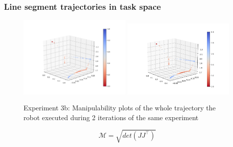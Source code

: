 \begin{frame}
\frametitle{Line segment trajectories in task space}
\begin{center}
\begin{figure}[!htb]
\centering
\includegraphics[width=0.49\textwidth]{../images/robot_planner3/robot_planner3b_manip1.png}
\includegraphics[width=0.49\textwidth]{../images/robot_planner3/robot_planner3b_manip2.png}
\caption{Experiment 3b: Manipulability plots of the whole trajectory the robot executed during 2 iterations of the same experiment}
\label{robot-planner3b-line-seg-manipulability-plots}
\end{figure}
\[
\mathcal{M} = \sqrt{det(J J^\top)}
\]
\end{center}
\end{frame}

